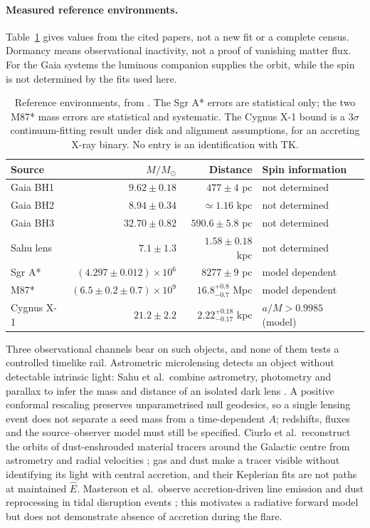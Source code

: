\documentclass[12pt]{iopart}
\theoremstyle{plain}
\theoremstyle{definition}
\theoremstyle{remark}
\newcommand{\Ehat}{\hat E}
\begin{document}
\paragraph{Measured reference environments.}
Table~\ref{tab:observational-context} gives values from the cited papers, not a
new fit or a complete census. Dormancy means observational inactivity, not a
proof of vanishing matter flux. For the Gaia systems the luminous companion
supplies the orbit, while the spin is not determined by the fits used here.

\begin{table}[ht]
\centering\small
\begin{tabular}{lrrl}
\hline
Source & $M/M_\odot$ & Distance & Spin information\\
\hline
Gaia BH1 & $9.62\pm0.18$ & $477\pm4$ pc & not determined\\
Gaia BH2 & $8.94\pm0.34$ & $\simeq1.16$ kpc & not determined\\
Gaia BH3 & $32.70\pm0.82$ & $590.6\pm5.8$ pc & not determined\\
Sahu lens & $7.1\pm1.3$ & $1.58\pm0.18$ kpc & not determined\\
Sgr A* & $(4.297\pm0.012)\times10^6$ & $8277\pm9$ pc & model dependent\\
M87* & $(6.5\pm0.2\pm0.7)\times10^9$ & $16.8^{+0.8}_{-0.7}$ Mpc & model dependent\\
Cygnus X-1 & $21.2\pm2.2$ & $2.22^{+0.18}_{-0.17}$ kpc & $a/M>0.9985$ (model)\\
\hline
\end{tabular}
\caption{Reference environments, from
\cite{ElBadry2023BH1,ElBadry2023BH2,Gaia2024BH3,Sahu2022,GRAVITY2022,EHT2019VI,EHT2022V,MillerJones2021,Zhao2021}.
The Sgr A* errors are statistical only; the two M87* mass errors are statistical
and systematic. The Cygnus X-1 bound is a $3\sigma$ continuum-fitting result
under disk and alignment assumptions, for an accreting X-ray binary. No entry is
an identification with TK.}
\label{tab:observational-context}
\end{table}

Three observational channels bear on such objects, and none of them tests a
controlled timelike rail. Astrometric microlensing detects an object without
detectable intrinsic light: Sahu et al.\ combine astrometry, photometry and
parallax to infer the mass and distance of an isolated dark lens
\cite{Sahu2022}. A positive conformal rescaling preserves unparametrised null
geodesics, so a single lensing event does not separate a seed mass from a
time-dependent $A$; redshifts, fluxes and the source--observer model must still
be specified. Ciurlo et al.\ reconstruct the orbits of dust-enshrouded material
tracers around the Galactic centre from astrometry and radial velocities
\cite{Ciurlo2020}; gas and dust make a tracer visible without identifying its
light with central accretion, and their Keplerian fits are not paths at
maintained $\Ehat$. Masterson et al.\ observe accretion-driven line emission and
dust reprocessing in tidal disruption events \cite{Masterson2025}; this motivates
a radiative forward model but does not demonstrate absence of accretion during
the flare.
\end{document}
